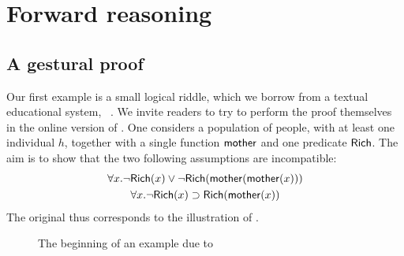 \section{Forward reasoning}


\subsection{A gestural proof}

\AP
Our first example is a small logical riddle, which we borrow from a textual
educational system, ~. We invite readers to try
to perform the proof themselves in the online version of
. One
considers a population of people, with at least one individual $h$, together
with a single function $\mbox{\textsf{mother}}$ and one predicate $\mbox{\textsf{Rich}}$. The aim is to show
that the two following assumptions are incompatible:
\begin{gather}
  \forall x. \neg\mbox{\textsf{Rich}}(x)\lor \neg\mbox{\textsf{Rich}}(\mbox{\textsf{mother}}(\mbox{\textsf{mother}}(x))) \label{hyp:1} \\
  \forall x. \neg\mbox{\textsf{Rich}}(x) \supset \mbox{\textsf{Rich}}(\mbox{\textsf{mother}}(x)) \label{hyp:2}
\end{gather}
The original  thus corresponds to the illustration of .

\begin{figure*}
  \caption{The beginning of an example due to }
\end{figure*}

